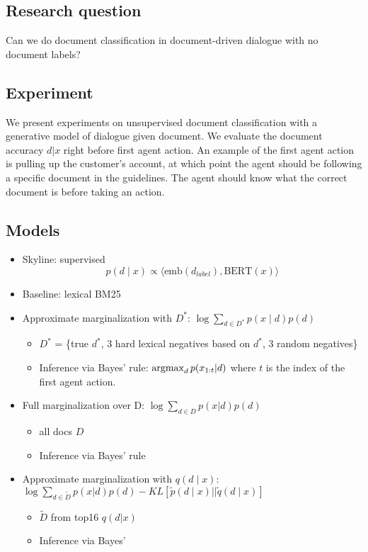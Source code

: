 \documentclass[11pt]{article}
\begin{document}
\subsection{Research question}
Can we do document classification in document-driven dialogue with no document labels?

\subsection{Experiment}
We present experiments on
unsupervised document classification with a generative model of dialogue given document.
We evaluate the document accuracy $d|x$ right before first agent action.
An example of the first agent action is pulling up the customer's account,
at which point the agent should be following a specific document in the guidelines.
The agent should know what the correct document is before taking an action.

\subsection{Models}
\begin{itemize}
\item Skyline: supervised $$p(d \mid x) \propto \langle \text{emb}(d_{label}), \text{BERT}(x)\rangle$$
\item Baseline: lexical BM25
\item Approximate marginalization with $D^*$: $\log\sum_{d\in D^*} p(x\mid d) p(d)$
    \begin{itemize}
    \item $D^*$ = \{true $d^*$, 3 hard lexical negatives based on $d^*$, 3 random negatives\}
    \item Inference via Bayes' rule: $\operatorname*{argmax}_d p(x_{1:t}|d)$ where $t$ is the index
        of the first agent action.
    \end{itemize}
\item Full marginalization over D: $\log\sum_{d\in D} p(x|d)p(d)$
    \begin{itemize}
    \item all docs $D$
    \item Inference via Bayes' rule
    \end{itemize}
\item Approximate marginalization with $q(d\mid x)$:
    $\log\sum_{d\in \tilde{D}} p(x|d)p(d) - KL[\tilde{p}(d\mid x)||\tilde{q}(d\mid x)]$
    \begin{itemize}
    \item $\tilde{D}$ from top16 $q(d|x)$
    \item Inference via Bayes'
    \end{itemize}
\end{itemize}
\end{document}

